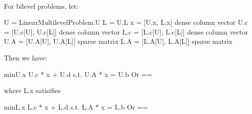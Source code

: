 \documentclass[letterpaper,10pt,english]{sphinxmanual}
\begin{document}
\begin{fulllineitems}
\label{\detokenize{reference/mpr:pao.mpr.repn.LinearMultilevelProblem}}~
\begin{sphinxVerbatim}[commandchars=\\\{\}]
For bilevel problems, let:

  U   = LinearMultilevelProblem.U
  L   = U.L
  x   = [U.x, L.x]\PYGZsq{}       \PYGZsh{} dense column vector
  U.c = [U.c[U], U.c[L]]\PYGZsq{} \PYGZsh{} dense column vector
  L.c = [L.c[U], L.c[L]]\PYGZsq{} \PYGZsh{} dense column vector
  U.A = [U.A[U], U.A[L]]  \PYGZsh{} sparse matrix
  L.A = [L.A[U], L.A[L]]  \PYGZsh{} sparse matrix

Then we have:

  min\PYGZus{}\PYGZob{}U.x\PYGZcb{}   U.c\PYGZsq{} * x + U.d
  s.t.        U.A  * x       \PYGZlt{}= U.b                  \PYGZsh{} Or ==

          where L.x satisifies

              min\PYGZus{}\PYGZob{}L.x\PYGZcb{}   L.c\PYGZsq{} * x + L.d
              s.t.        L.A  * x       \PYGZlt{}= L.b      \PYGZsh{} Or ==
\end{sphinxVerbatim}

\end{fulllineitems}

\end{document}
